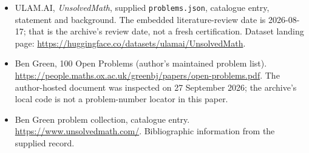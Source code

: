 \documentclass[11pt,a4paper]{article}
\begin{document}
{\small

\begin{itemize}

\item[\hypertarget{source:statement:1}{S1}] ULAM.AI, \emph{UnsolvedMath}, supplied \texttt{problems.json}, catalogue entry, statement and background. The embedded literature-review date is 2026-08-17; that is the archive’s review date, not a fresh certification. Dataset landing page: \url{https://huggingface.co/datasets/ulamai/UnsolvedMath}.

\item[\hypertarget{source:statement:2}{S2}] Ben Green, 100 Open Problems (author’s maintained problem list). \url{https://people.maths.ox.ac.uk/greenbj/papers/open-problems.pdf}. The author-hosted document was inspected on 27 September 2026; the archive’s local code is not a problem-number locator in this paper.

\item[\hypertarget{source:statement:3}{S3}] Ben Green problem collection, catalogue entry. \url{https://www.unsolvedmath.com/}. Bibliographic information from the supplied record.

\end{itemize}

}

\label{end:statement}
\end{document}
